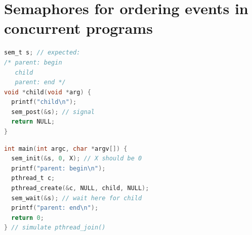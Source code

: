 \section*{Semaphores for ordering events in concurrent programs}
\begin{minipage}{.4\linewidth}
\begin{lstlisting}[language=c,xleftmargin=2pt,xrightmargin=2pt]
sem_t s; // expected:
/* parent: begin
   child
   parent: end */
void *child(void *arg) {
  printf("child\n");
  sem_post(&s); // signal
  return NULL;
}
\end{lstlisting}
\end{minipage}
\begin{minipage}{.6\linewidth}
\begin{lstlisting}[language=c,xleftmargin=2pt,xrightmargin=2pt]
int main(int argc, char *argv[]) {
  sem_init(&s, 0, X); // X should be 0
  printf("parent: begin\n");
  pthread_t c;
  pthread_create(&c, NULL, child, NULL);
  sem_wait(&s); // wait here for child
  printf("parent: end\n");
  return 0;
} // simulate pthread_join()
\end{lstlisting}
\end{minipage}

